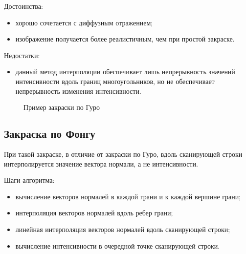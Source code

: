 Достоинства:

\begin{itemize}
	\item хорошо сочетается с диффузным отражением;
	\item изображение получается более реалистичным, чем при простой закраске.
\end{itemize}

Недостатки:

\begin{itemize}
	\item данный метод интерполяции обеспечивает лишь непрерывность значений интенсивности вдоль границ многоугольников, но не обеспечивает непрерывность изменения интенсивности.
\end{itemize}

\begin{figure}[ph!]
	\caption{Пример закраски по Гуро}
	\label{fig:draw_guro}
\end{figure}

\subsection{Закраска по Фонгу}

При такой закраске, в отличие от закраски по Гуро, вдоль сканирующей строки интерполируется значение вектора нормали, а не интенсивности. 

Шаги алгоритма:

\begin{itemize}
	\item вычисление векторов нормалей в каждой грани и к каждой вершине грани;
	\item интерполяция векторов нормалей вдоль ребер грани;
	\item линейная интерполяция векторов нормалей вдоль сканирующей строки;
	\item вычисление интенсивности в очередной точке сканирующей строки.
\end{itemize}

